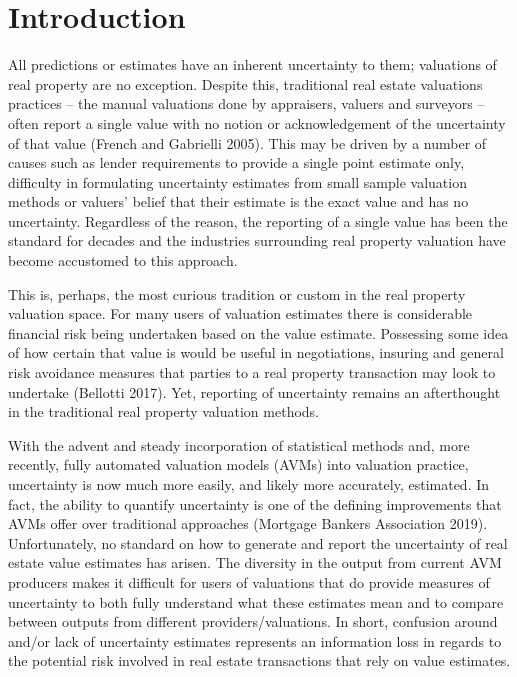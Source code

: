 \documentclass[colTwo]{anon}
\theoremstyle{definition}
\begin{document}
\section{Introduction}
All predictions or estimates have an inherent uncertainty to them; valuations of real property are no exception. Despite this, traditional real estate valuations practices -- the manual valuations done by appraisers, valuers and surveyors -- often report a single value with no notion or acknowledgement of the uncertainty of that value (French and Gabrielli 2005).  This may be driven by a number of causes such as lender requirements to provide a single point estimate only, difficulty in formulating uncertainty estimates from small sample valuation methods or valuers' belief that their estimate is the exact value and has no uncertainty.  Regardless of the reason, the reporting of a single value has been the standard for decades and the industries surrounding real property valuation have become accustomed to this approach.  

This is, perhaps, the most curious tradition or custom in the real property valuation space.  For many users of valuation estimates there is considerable financial risk being undertaken based on the value estimate.  Possessing some idea of how certain that value is would be useful in negotiations, insuring and general risk avoidance measures that parties to a real property transaction may look to undertake (Bellotti 2017).  Yet, reporting of uncertainty remains an afterthought in the traditional real property valuation methods.  

With the advent and steady incorporation of statistical methods and, more recently, fully automated valuation models (AVMs) into valuation practice, uncertainty is now much more easily, and likely more accurately, estimated. In fact, the ability to quantify uncertainty is one of the defining improvements that AVMs offer over traditional approaches (Mortgage Bankers Association 2019). Unfortunately, no standard on how to generate and report the uncertainty of real estate value estimates has arisen.  The diversity in the output from current AVM producers makes it difficult for users of valuations that do provide measures of uncertainty to both fully understand what these estimates mean and to compare between outputs from different providers/valuations.  In short, confusion around and/or lack of uncertainty estimates represents an information loss in regards to the potential risk involved in real estate transactions that rely on value estimates.      
\end{document}

